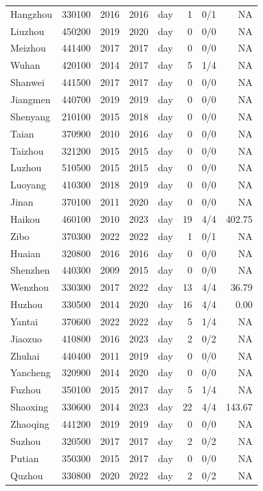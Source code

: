 \begin{longtable}{@{}llrrlrrr@{}}
Hangzhou & 330100 & 2016 & 2016 & day & 1 & 0/1 & NA \\
Liuzhou & 450200 & 2019 & 2020 & day & 0 & 0/0 & NA \\
Meizhou & 441400 & 2017 & 2017 & day & 0 & 0/0 & NA \\
Wuhan & 420100 & 2014 & 2017 & day & 5 & 1/4 & NA \\
Shanwei & 441500 & 2017 & 2017 & day & 0 & 0/0 & NA \\
Jiangmen & 440700 & 2019 & 2019 & day & 0 & 0/0 & NA \\
Shenyang & 210100 & 2015 & 2018 & day & 0 & 0/0 & NA \\
Taian & 370900 & 2010 & 2016 & day & 0 & 0/0 & NA \\
Taizhou & 321200 & 2015 & 2015 & day & 0 & 0/0 & NA \\
Luzhou & 510500 & 2015 & 2015 & day & 0 & 0/0 & NA \\
Luoyang & 410300 & 2018 & 2019 & day & 0 & 0/0 & NA \\
Jinan & 370100 & 2011 & 2020 & day & 0 & 0/0 & NA \\
Haikou & 460100 & 2010 & 2023 & day & 19 & 4/4 & 402.75 \\
Zibo & 370300 & 2022 & 2022 & day & 1 & 0/1 & NA \\
Huaian & 320800 & 2016 & 2016 & day & 0 & 0/0 & NA \\
Shenzhen & 440300 & 2009 & 2015 & day & 0 & 0/0 & NA \\
Wenzhou & 330300 & 2017 & 2022 & day & 13 & 4/4 & 36.79 \\
Huzhou & 330500 & 2014 & 2020 & day & 16 & 4/4 & 0.00 \\
Yantai & 370600 & 2022 & 2022 & day & 5 & 1/4 & NA \\
Jiaozuo & 410800 & 2016 & 2023 & day & 2 & 0/2 & NA \\
Zhuhai & 440400 & 2011 & 2019 & day & 0 & 0/0 & NA \\
Yancheng & 320900 & 2014 & 2020 & day & 0 & 0/0 & NA \\
Fuzhou & 350100 & 2015 & 2017 & day & 5 & 1/4 & NA \\
Shaoxing & 330600 & 2014 & 2023 & day & 22 & 4/4 & 143.67 \\
Zhaoqing & 441200 & 2019 & 2019 & day & 0 & 0/0 & NA \\
Suzhou & 320500 & 2017 & 2017 & day & 2 & 0/2 & NA \\
Putian & 350300 & 2015 & 2017 & day & 0 & 0/0 & NA \\
Quzhou & 330800 & 2020 & 2022 & day & 2 & 0/2 & NA \\

\end{longtable}
